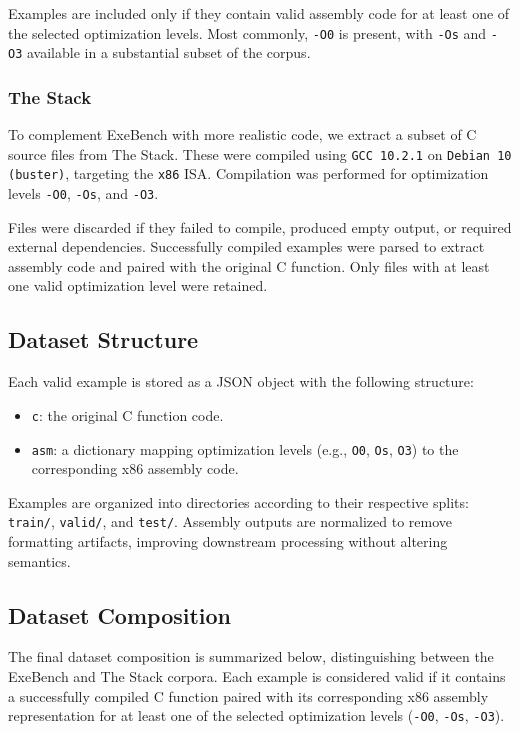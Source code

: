 \documentclass[../main.tex]{subfiles}
\begin{document}
Examples are included only if they contain valid assembly code for at least one of the selected optimization levels. Most commonly, \texttt{-O0} is present, with \texttt{-Os} and \texttt{-O3} available in a substantial subset of the corpus.

\subsubsection{The Stack}

To complement ExeBench with more realistic code, we extract a subset of C source files from The Stack. These were compiled using \texttt{GCC 10.2.1} on \texttt{Debian 10 (buster)}, targeting the \texttt{x86} ISA. Compilation was performed for optimization levels \texttt{-O0}, \texttt{-Os}, and \texttt{-O3}.

Files were discarded if they failed to compile, produced empty output, or required external dependencies. Successfully compiled examples were parsed to extract assembly code and paired with the original C function. Only files with at least one valid optimization level were retained.

\subsection{Dataset Structure}

Each valid example is stored as a JSON object with the following structure:

\begin{itemize}
    \item \texttt{c}: the original C function code.
    \item \texttt{asm}: a dictionary mapping optimization levels (e.g., \texttt{O0}, \texttt{Os}, \texttt{O3}) to the corresponding x86 assembly code.
\end{itemize}

Examples are organized into directories according to their respective splits: \texttt{train/}, \texttt{valid/}, and \texttt{test/}. Assembly outputs are normalized to remove formatting artifacts, improving downstream processing without altering semantics.

\subsection{Dataset Composition}

The final dataset composition is summarized below, distinguishing between the ExeBench and The Stack corpora. Each example is considered valid if it contains a successfully compiled C function paired with its corresponding x86 assembly representation for at least one of the selected optimization levels (\texttt{-O0}, \texttt{-Os}, \texttt{-O3}).
\end{document}

